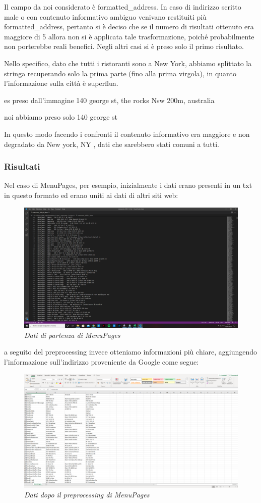 \documentclass[a4paper,12pt]{article}
\begin{document}
\noindent Il campo da noi considerato è formatted\_address. In caso di indirizzo scritto male o con contenuto informativo ambiguo venivano restituiti più formatted\_address, pertanto si è deciso che se il numero di risultati ottenuto era maggiore di 5 allora non si è applicata tale trasformazione, poiché probabilmente non porterebbe reali benefici. Negli altri casi si è preso solo il primo risultato. 

Nello specifico,  dato che tutti i ristoranti sono a New York, abbiamo splittato la stringa recuperando solo la prima parte (fino alla prima virgola), in quanto l'informazione sulla città è superflua. 
 
es preso dall'immagine
140 george st, the rocks Nsw 200m, australia

noi abbiamo preso solo 140 george st

In questo modo facendo i confronti il contenuto informativo era maggiore e non degradato da New york, NY , dati che sarebbero stati comuni a tutti.

\subsubsection{Risultati}
Nel caso di MenuPages, per esempio, inizialmente i dati erano presenti in un txt in questo formato ed erano uniti ai dati di altri siti web:\\
\begin{figure}[H]
\centering
\includegraphics[width=0.65\linewidth]{img/original.png}
\caption{\textit{Dati di partenza di MenuPages}}
\end{figure}

a seguito del preprocessing invece otteniamo informazioni più chiare, aggiungendo l'informazione sull'indirizzo proveniente da Google come segue:\\

\begin{figure}[H]
\centering
\includegraphics[width=0.65\linewidth]{img/new.png}
\caption{\textit{Dati dopo il preprocessing di MenuPages}}
\end{figure}
\end{document}
